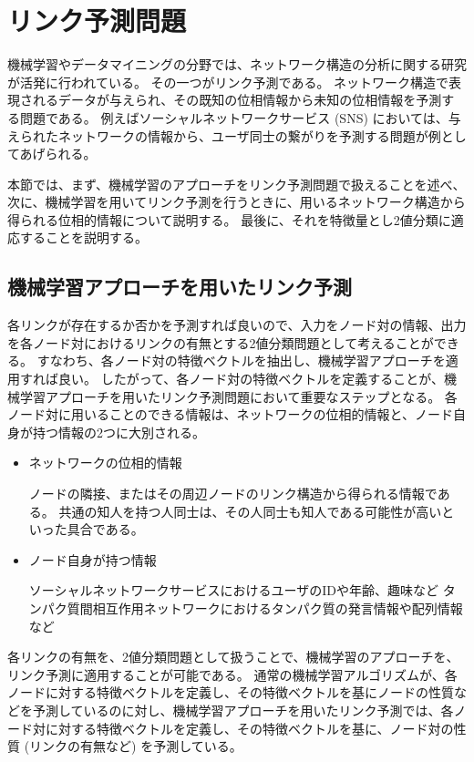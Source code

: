 \documentclass[titlepage,12pt]{jreport}
\def\ex{\noindent{{\bf 例}：}}
\begin{document}
\section{リンク予測問題\label{link_prediction}}
機械学習やデータマイニングの分野では、ネットワーク構造の分析に関する研究が活発に行われている。 その一つがリンク予測である。 ネットワーク構造で表現されるデータが与えられ、その既知の位相情報から未知の位相情報を予測する問題である。 例えばソーシャルネットワークサービス (SNS) においては、与えられたネットワークの情報から、ユーザ同士の繋がりを予測する問題が例としてあげられる。 

本節では、まず、機械学習のアプローチをリンク予測問題で扱えることを述べ、次に、機械学習を用いてリンク予測を行うときに、用いるネットワーク構造から得られる位相的情報について説明する。 最後に、それを特徴量とし2値分類に適応することを説明する。

\subsection{機械学習アプローチを用いたリンク予測}
各リンクが存在するか否かを予測すれば良いので、入力をノード対の情報、出力を各ノード対におけるリンクの有無とする2値分類問題として考えることができる。 すなわち、各ノード対の特徴ベクトルを抽出し、機械学習アプローチを適用すれば良い。 したがって、各ノード対の特徴ベクトルを定義することが、機械学習アプローチを用いたリンク予測問題において重要なステップとなる。 各ノード対に用いることのできる情報は、ネットワークの位相的情報と、ノード自身が持つ情報の2つに大別される。
\begin{itemize}
	\item ネットワークの位相的情報 \par ノードの隣接、またはその周辺ノードのリンク構造から得られる情報である。 共通の知人を持つ人同士は、その人同士も知人である可能性が高いといった具合である。
	\item ノード自身が持つ情報 \par \ex ソーシャルネットワークサービスにおけるユーザのIDや年齢、趣味など タンパク質間相互作用ネットワークにおけるタンパク質の発言情報や配列情報など
\end{itemize}

各リンクの有無を、2値分類問題として扱うことで、機械学習のアプローチを、リンク予測に適用することが可能である。 %
通常の機械学習アルゴリズムが、各ノードに対する特徴ベクトルを定義し、その特徴ベクトルを基にノードの性質などを予測しているのに対し、機械学習アプローチを用いたリンク予測では、各ノード対に対する特徴ベクトルを定義し、その特徴ベクトルを基に、ノード対の性質 (リンクの有無など) を予測している。
\end{document}
